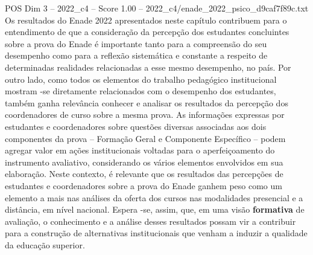 \begin{textsample}{POS Dim 3 – 2022\_c4 – Score 1.00 – 2022\_c4/enade\_2022\_psico\_d9caf7f89c.txt}
Os resultados do Enade 2022 apresentados neste capítulo contribuem para o entendimento de que a consideração da percepção dos estudantes concluintes sobre a prova do Enade é importante tanto para a compreensão do seu desempenho como para a reflexão sistemática e constante a respeito de determinadas realidades relacionadas a esse mesmo desempenho, no país.
Por outro lado, como todos os elementos do trabalho pedagógico institucional mostram -se diretamente relacionados com o desempenho dos estudantes, também ganha relevância conhecer e analisar os resultados da percepção dos coordenadores de curso sobre a mesma prova.
As informações expressas por estudantes e coordenadores sobre questões diversas associadas aos dois componentes da prova – Formação Geral e Componente Específico – podem agregar valor em ações institucionais voltadas para o aperfeiçoamento do instrumento avaliativo, considerando os vários elementos envolvidos em sua elaboração.
Neste contexto, é relevante que os resultados das percepções de estudantes e coordenadores sobre a prova do Enade ganhem peso como um elemento a mais nas análises da oferta dos cursos nas modalidades presencial e a distância, em nível nacional.
Espera -se, assim, que, em uma visão \textbf{formativa} de avaliação, o conhecimento e a análise desses resultados possam vir a contribuir para a construção de alternativas institucionais que venham a induzir a qualidade da educação superior.

\end{textsample}
